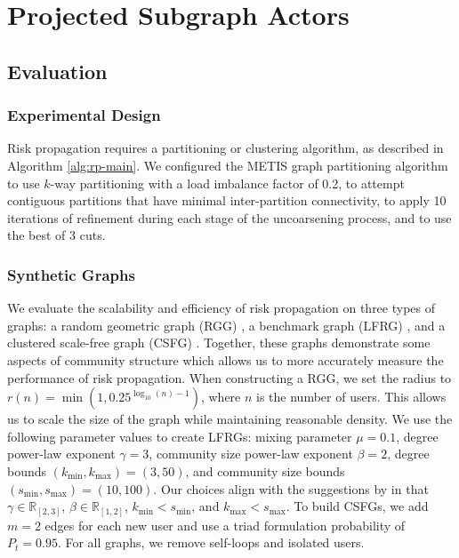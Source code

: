 \section{Projected Subgraph Actors}\label{sec:projected-subgraphs}

\subsection{Evaluation}\label{sec:evaluation}

\subsubsection{Experimental Design}

Risk propagation requires a partitioning or clustering algorithm, as described in Algorithm \ref{alg:rp-main}. We configured the METIS graph partitioning algorithm \cite{Karypis1998} to use $k$-way partitioning with a load imbalance factor of 0.2, to attempt contiguous partitions that have minimal inter-partition connectivity, to apply 10 iterations of refinement during each stage of the uncoarsening process, and to use the best of 3 cuts.

\subsubsection{Synthetic Graphs}\label{sec:synthetic-eval}

We evaluate the scalability and efficiency of risk propagation on three types of graphs: a random geometric graph (RGG) \cite{Dall2002}, a benchmark graph (LFRG) \cite{Lancichinetti2008}, and a clustered scale-free graph (CSFG) \cite{Holme2002}. Together, these graphs demonstrate some aspects of community structure \cite{Fortunato2010} which allows us to more accurately measure the performance of risk propagation. When constructing a RGG, we set the radius to $r(n) = \min \left(1, 0.25^{\log_{10}(n) - 1}\right)$, where $n$ is the number of users. This allows us to scale the size of the graph while maintaining reasonable density. We use the following parameter values to create LFRGs: mixing parameter $\mu = 0.1$, degree power-law exponent $\gamma = 3$, community size power-law exponent $\beta = 2$, degree bounds $(k_{\min}, k_{\max}) = (3, 50)$, and community size bounds $(s_{\min}, s_{\max}) = (10, 100)$. Our choices align with the suggestions by \cite{Lancichinetti2008} in that $\gamma \in \mathbb{R}_{[2, 3]}$,  $\beta \in \mathbb{R}_{[1, 2]}$, $k_{\min} < s_{\min}$, and $k_{\max} < s_{\max}$. To build CSFGs, we add $m = 2$ edges for each new user and use a triad formulation probability of $P_t = 0.95$. For all graphs, we remove self-loops and isolated users.

